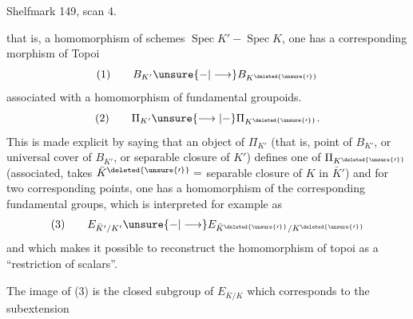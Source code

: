 Shelfmark 149, scan 4.

that is, a homomorphism of schemes $\operatorname{Spec}K' - \operatorname{Spec}K$, one has a corresponding morphism of Topoi
\[
(1)\qquad B_{K'}\unsure{-|\longrightarrow}B_{K^{\deleted{\unsure{\prime}}}}
\]
associated with a homomorphism of fundamental groupoids.
\[
(2)\qquad \Pi_{K'}\unsure{\longrightarrow|-}\Pi_{K^{\deleted{\unsure{\prime}}}}.
\]
This is made explicit by saying that an  object of $\Pi_{K'}$ (that is, point of $B_{K'}$, or universal cover of $B_{K'}$, \deleted{)} or separable closure of $K'$) defines one of $\Pi_{K^{\deleted{\unsure{\prime}}}}$ (associated,  takes $\bar K^{\deleted{\unsure{\prime}}}=$ separable  closure of $K$ in $\bar K'$) and for two corresponding points, one has a homomorphism of the corresponding fundamental groups, which is interpreted for example as
\[
(3)\qquad E_{\bar K'/K'}\unsure{-|\longrightarrow}E_{\bar K^{\deleted{\unsure{\prime}}}/K^{\deleted{\unsure{\prime}}}}
\]
and which makes it possible to reconstruct the homomorphism of topoi as a ``restriction of scalars''.

The image of (3) is the closed subgroup of $E_{\bar K/K}$ which corresponds to the subextension

